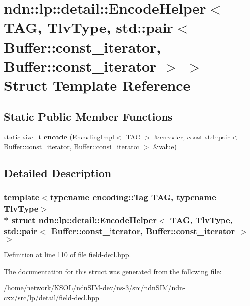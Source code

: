 \hypertarget{structndn_1_1lp_1_1detail_1_1EncodeHelper_3_01TAG_00_01TlvType_00_01std_1_1pair_3_01Buffer_1_1co9e3346d932022ac6ab9b7be61f91d7a4}{}\section{ndn\+:\+:lp\+:\+:detail\+:\+:Encode\+Helper$<$ T\+AG, Tlv\+Type, std\+:\+:pair$<$ Buffer\+:\+:const\+\_\+iterator, Buffer\+:\+:const\+\_\+iterator $>$ $>$ Struct Template Reference}
\label{structndn_1_1lp_1_1detail_1_1EncodeHelper_3_01TAG_00_01TlvType_00_01std_1_1pair_3_01Buffer_1_1co9e3346d932022ac6ab9b7be61f91d7a4}
\subsection*{Static Public Member Functions}
\begin{DoxyCompactItemize}
\item 
static size\+\_\+t {\bfseries encode} (\hyperlink{classndn_1_1encoding_1_1EncodingImpl}{Encoding\+Impl}$<$ T\+AG $>$ \&encoder, const std\+::pair$<$ Buffer\+::const\+\_\+iterator, Buffer\+::const\+\_\+iterator $>$ \&value)\hypertarget{structndn_1_1lp_1_1detail_1_1EncodeHelper_3_01TAG_00_01TlvType_00_01std_1_1pair_3_01Buffer_1_1co9e3346d932022ac6ab9b7be61f91d7a4_a614a15fa75e6e037ab040b8f17f89973}{}\label{structndn_1_1lp_1_1detail_1_1EncodeHelper_3_01TAG_00_01TlvType_00_01std_1_1pair_3_01Buffer_1_1co9e3346d932022ac6ab9b7be61f91d7a4_a614a15fa75e6e037ab040b8f17f89973}

\end{DoxyCompactItemize}


\subsection{Detailed Description}
\subsubsection*{template$<$typename encoding\+::\+Tag T\+AG, typename Tlv\+Type$>$\\*
struct ndn\+::lp\+::detail\+::\+Encode\+Helper$<$ T\+A\+G, Tlv\+Type, std\+::pair$<$ Buffer\+::const\+\_\+iterator, Buffer\+::const\+\_\+iterator $>$ $>$}



Definition at line 110 of file field-\/decl.\+hpp.



The documentation for this struct was generated from the following file\+:\begin{DoxyCompactItemize}
\item 
/home/network/\+N\+S\+O\+L/ndn\+S\+I\+M-\/dev/ns-\/3/src/ndn\+S\+I\+M/ndn-\/cxx/src/lp/detail/field-\/decl.\+hpp\end{DoxyCompactItemize}
